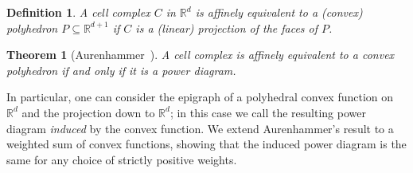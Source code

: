 \documentclass[12pt]{article}
\newcommand{\reals}{\mathbb{R}}
\newtheorem{theorem}{Theorem}
\newtheorem{definition}{Definition}
\begin{document}
\begin{definition}\label{def:affine-equiv}
  A cell complex $C$ in $\reals^d$ is \emph{affinely equivalent} to a (convex) polyhedron $P \subseteq \reals^{d+1}$ if $C$ is a (linear) projection of the faces of $P$.
\end{definition}

\begin{theorem}[Aurenhammer~\cite{aurenhammer1987power}]\label{thm:aurenhammer}
  A cell complex is affinely equivalent to a convex polyhedron if and only if it is a power diagram.
\end{theorem}

In particular, one can consider the epigraph of a polyhedral convex function on $\reals^d$ and the projection down to $\reals^d$; in this case we call the resulting power diagram \emph{induced} by the convex function.
We extend Aurenhammer's result to a weighted sum of convex functions, showing that the induced power diagram is the same for any choice of strictly positive weights.
\end{document}
